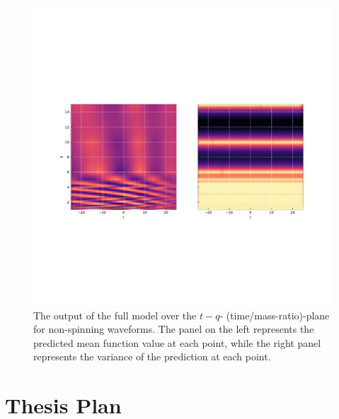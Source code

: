 \documentclass{kentigern}
\theoremstyle{definition}
\begin{document}
\begin{figure}
  \includegraphics[width=\textwidth, trim={1cm 8cm 2cm 8cm},clip]{figures/heron/monster_qplane.pdf}
  \caption{The output of the full \heron{} model over the $t-q$-
    (time/mass-ratio)-plane for non-spinning waveforms. The panel on
    the left represents the predicted mean function value at each
    point, while the right panel represents the variance of the
    prediction at each point. \label{fig:qtplane}}
\end{figure}

\chapter{Thesis Plan}
\chapterprecis{}
\end{document}
